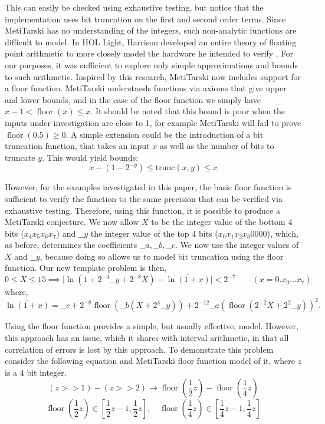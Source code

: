 \documentclass{fac}
\newcommand{\abs}[1]{\lvert#1\rvert}
\newcommand{\floor}{\mathop{\textrm{floor}}\nolimits}
\begin{document}
This can easily be checked using exhaustive testing, but notice that the implementation uses bit truncation on the first and second order terms. Since MetiTarski has no understanding of the integers, such non-analytic functions are difficult to model. In HOL Light, Harrison developed an entire theory of floating point arithmetic to more closely model the hardware he intended to verify \cite{harrison1999machine}. For our purposes, it was sufficient to explore only simple approximations and bounds to such arithmetic. Inspired by this research, MetiTarski now includes support for a floor function. MetiTarski understands functions via axioms that give upper and lower bounds, and in the case of the floor function we simply have $x-1< \floor(x)\le x$. It should be noted that this bound is poor when the inputs under investigation are close to 1, for example MetiTarski will fail to prove $\floor(0.5)\geq 0$. A simple extension could be the introduction of a bit truncation function, that takes an input $x$ as well as the number of bits to truncate $y$. This would yield bounds:
\begin{equation*}
    x - (1-2^{-y}) \leq \textrm{trunc}(x,y)\leq x
\end{equation*}

However, for the examples investigated in this paper, the basic floor function is sufficient to verify the function to the same precision that can be verified via exhaustive testing. Therefore, using this function, it is possible to produce a MetiTarski conjecture. We now allow $X$ to be the integer value of the bottom 4 bits ($x_4x_5x_6x_7$) and $\_\_y$ the integer value of the top 4 bits ($x_0x_1x_2x_3 0000$), which, as before, determines the coefficients $\_\_a, \_\_b, \_\_c$. We now use the integer values of $X$ and $\_\_y$, because doing so allows us to model bit truncation using the floor function. Our new template problem is then, 
\[
0\le X \le 15 \implies \abs{\ln(1+2^{-4}\_\_y+2^{-8}X) - \overline{\ln(1+x)}} <2^{-7} \qquad (x= 0.x_0...x_7)
\]
where,
\[
\overline{\ln(1+x)}=\_\_c+2^{-8}\floor(\_\_b(X+2^{4}\_\_y))+2^{-12}\_\_a(\floor(2^{-2}X+2^{2}\_\_y))^2.
\]

Using the floor function provides a simple, but usually effective, model. However, this approach has an issue, which it shares with interval arithmetic, in that all correlation of errors is lost by this approach. To demonstrate this problem consider the following equation and MetiTarski floor function model of it, where $z$ is a 4 bit integer.
\[
(z>>1) - (z>>2) \rightarrow  \floor(\frac{1}{2}z) - \floor(\frac{1}{4}z)
\]
\[
\floor(\frac{1}{2}z) \in [\frac{1}{2}z-1, \frac{1}{2}z], \quad \floor(\frac{1}{4}z) \in [\frac{1}{4}z-1,\frac{1}{4}z]
\]
\end{document}
